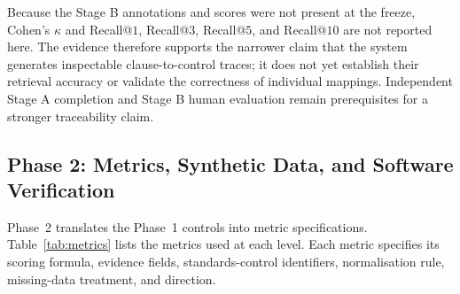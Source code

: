 \documentclass[final,3p,times,twocolumn]{elsarticle}
\begin{document}
	Because the Stage B annotations and scores were not present at the freeze,
	Cohen's $\kappa$ and Recall@$1$, Recall@$3$, Recall@$5$, and Recall@$10$ are
	not reported here. The evidence therefore supports the narrower claim that
	the system generates inspectable clause-to-control traces; it does not yet
	establish their retrieval accuracy or validate the correctness of individual
	mappings. Independent Stage A completion and Stage B human evaluation remain
	prerequisites for a stronger traceability claim.
  

	\subsection{Phase 2: Metrics, Synthetic Data, and Software Verification}
	\label{sec:phase2} Phase~2 translates the Phase~1 controls into metric
	specifications. Table~\ref{tab:metrics} lists the metrics used at each level.
	Each metric specifies its scoring formula, evidence fields, standards-control
	identifiers, normalisation rule, missing-data treatment, and direction.
\end{document}
